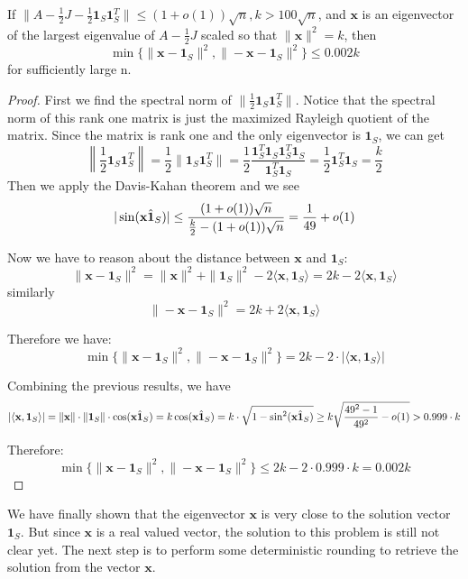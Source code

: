 \documentclass{article}
\begin{document}
\begin{corollary}
    \label{closeness}
    If $\|A-\frac{1}{2}J - \frac{1}{2}\mathbf{1}_S\mathbf{1}_S^T\| \leq (1+o(1))\sqrt{n}, k>100\sqrt{n}$, and $\mathbf{x}$ is an eigenvector of the largest eigenvalue of $A-\frac{1}{2}J$ scaled so that $\|\mathbf{x}\|^2=k$, then
    $$\min\{\|\mathbf{x}-\mathbf{1}_S\|^2, \|-\mathbf{x}-\mathbf{1}_S\|^2\} \leq 0.002k$$
    for sufficiently large n.
\end{corollary}

\begin{proof}
First we find the spectral norm of $\|\frac{1}{2}\mathbf{1}_S\mathbf{1}_S^T\|$.
Notice that the spectral norm of this rank one matrix is just the maximized
Rayleigh quotient of the matrix. Since the matrix is rank one and the only eigenvector is $\mathbf{1}_S$, we can get
$$
\left\|\frac{1}{2}\mathbf{1}_S\mathbf{1}_S^T\right\| = 
\frac{1}{2}\|\mathbf{1}_S\mathbf{1}_S^T\| = 
\dfrac{1}{2}\dfrac{\mathbf{1}_S^T\mathbf{1}_S\mathbf{1}_S^T\mathbf{1}_S}{\mathbf{1}_S^T\mathbf{1}_S} = \dfrac{1}{2}\mathbf{1}_S^T\mathbf{1}_S = \dfrac{k}{2}
$$
Then we apply the Davis-Kahan theorem and we see 
$$|\sin(\Hat{\mathbf{x} \mathbf{1}_S})| \leq \dfrac{(1+o(1))\sqrt{n}}{\frac{k}{2} - (1 + o(1))\sqrt{n}} = \frac{1}{49} + o(1)$$

Now we have to reason about the distance between $\mathbf{x}$ and $\mathbf{1}_S$:
$$\|\mathbf{x} - \mathbf{1}_S\|^2 = \|\mathbf{x}\|^2 + \|\mathbf{1}_S\|^2 - 2 \langle \mathbf{x}, \mathbf{1}_S\rangle = 2k - 2 \langle \mathbf{x}, \mathbf{1}_S\rangle $$
similarly
$$\|- \mathbf{x} - \mathbf{1}_S\|^2 = 2k + 2 \langle \mathbf{x}, \mathbf{1}_S\rangle $$

Therefore we have:
$$\min\{\|\mathbf{x} - \mathbf{1}_S\|^2, \|- \mathbf{x} - \mathbf{1}_S\|^2\} = 2k - 2\cdot |\langle \mathbf{x}, \mathbf{1}_S\rangle|$$

Combining the previous results, we have
$$|\langle \mathbf{x}, \mathbf{1}_S\rangle| = \|\mathbf{x}\|\cdot\|\mathbf{1}_S\|\cdot \cos(\Hat{\mathbf{x}\mathbf{1}_S}) = k \cos(\Hat{\mathbf{x}\mathbf{1}_S}) = k\cdot \sqrt{1 - \sin^2({\Hat{\mathbf{x}\mathbf{1}_S}})} \geq k \sqrt{\dfrac{49^2 - 1}{49^2} - o(1)} > 0.999 \cdot k$$

Therefore:
$$\min\{\|\mathbf{x}-\mathbf{1}_S\|^2, \|-\mathbf{x}-\mathbf{1}_S\|^2\} \leq 2k - 2\cdot 0.999\cdot k = 0.002k$$
\end{proof}

We have finally shown that the eigenvector $\mathbf{x}$ is very close to the
solution vector $\mathbf{1}_S$. But since $\mathbf{x}$ is a real valued vector,
the solution to this problem is still not clear yet. The next step is to
perform some deterministic rounding to retrieve the solution from the vector
$\mathbf{x}$.
\end{document}
